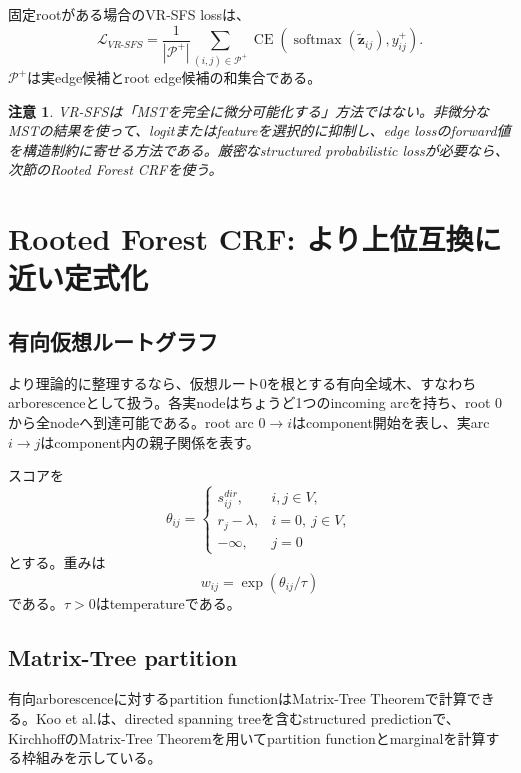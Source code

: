 \documentclass[11pt,a4paper]{article}
\newtheorem{remark}{注意}
\newcommand{\softmax}{\operatorname{softmax}}
\begin{document}
固定rootがある場合のVR-SFS lossは、
\begin{equation}
  \mathcal{L}_{VR\text{-}SFS}
  =
  \frac{1}{|\mathcal{P}^+|}
  \sum_{(i,j)\in\mathcal{P}^+}
  \operatorname{CE}(\softmax(\tilde{\bm{z}}_{ij}),y^+_{ij}).
  \label{eq:vr_sfs_loss}
\end{equation}
$\mathcal{P}^+$は実edge候補とroot edge候補の和集合である。

\begin{remark}
VR-SFSは「MSTを完全に微分可能化する」方法ではない。非微分なMSTの結果を使って、logitまたはfeatureを選択的に抑制し、edge lossのforward値を構造制約に寄せる方法である。厳密なstructured probabilistic lossが必要なら、次節のRooted Forest CRFを使う。
\end{remark}

\section{Rooted Forest CRF: より上位互換に近い定式化}
\subsection{有向仮想ルートグラフ}
より理論的に整理するなら、仮想ルート$0$を根とする有向全域木、すなわちarborescenceとして扱う。各実nodeはちょうど1つのincoming arcを持ち、root $0$から全nodeへ到達可能である。root arc $0\to i$はcomponent開始を表し、実arc $i\to j$はcomponent内の親子関係を表す。

スコアを
\begin{equation}
  \theta_{ij}=\begin{cases}
    s_{ij}^{dir}, & i,j\in V,
    \\
    r_j-\lambda, & i=0,\ j\in V,
    \\
    -\infty, & j=0
  \end{cases}
\end{equation}
とする。重みは
\begin{equation}
  w_{ij}=\exp(\theta_{ij}/\tau)
\end{equation}
である。$\tau>0$はtemperatureである。

\subsection{Matrix-Tree partition}
有向arborescenceに対するpartition functionはMatrix-Tree Theoremで計算できる。Koo et al.は、directed spanning treeを含むstructured predictionで、KirchhoffのMatrix-Tree Theoremを用いてpartition functionとmarginalを計算する枠組みを示している\cite{koo2007}。
\end{document}
